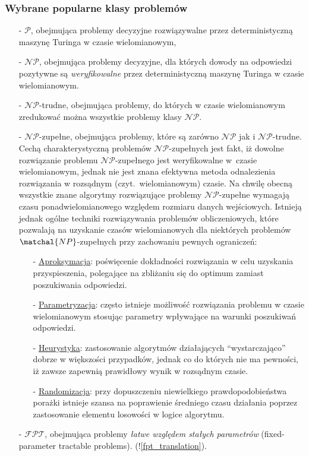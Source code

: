 \subsubsection{Wybrane popularne klasy problemów}
\label{sss_popular_cplx_classes}
\begin{itemize}
  \item[-] $\mathcal{P}$, obejmująca problemy decyzyjne rozwiązywalne przez
    deterministyczną maszynę Turinga w czasie wielomianowym,
  \item[-] $\mathcal{NP}$, obejmująca problemy decyzyjne, dla których dowody na 
    odpowiedzi pozytywne są \emph{weryfikowalne} przez deterministyczną maszynę
    Turinga w czasie wielomianowym.
  \item[-] $\mathcal{NP}$-trudne, obejmująca problemy, do których w czasie
    wielomianowym zredukować można wszystkie problemy klasy $\mathcal{NP}$.
  \item[-] $\mathcal{NP}$-zupełne, obejmująca problemy, które są zarówno
    $\mathcal{NP}$ jak i $\mathcal{NP}$-trudne.
    Cechą charakterystyczną problemów $\mathcal{NP}$-zupełnych jest fakt, iż
    dowolne rozwiązanie problemu $\mathcal{NP}$-zupełnego jest weryfikowalne
    w~czasie wielomianowym, jednak nie jest znana efektywna metoda odnalezienia
    rozwiązania w rozsądnym (czyt.\ wielomianowym) czasie. 
    Na chwilę obecną wszystkie znane algorytmy rozwiązujące problemy 
    $\mathcal{NP}$-zupełne wymagają czasu ponadwielomianowego względem rozmiaru
    danych wejściowych.
    Istnieją jednak ogólne techniki rozwiązywania problemów obliczeniowych,
    które pozwalają na uzyskanie czasów wielomianowych dla niektórych problemów
    $\matchal{NP}$-zupełnych przy zachowaniu pewnych ograniczeń:
    \begin{itemize}
      \item[-] \underline{Aproksymacja}: poświęcenie dokładności rozwiązania
        w celu uzyskania przyspieszenia, polegające na zbliżaniu się do
        optimum zamiast poszukiwania odpowiedzi.
      \item[-] \underline{Parametryzacja}: często istnieje możliwość rozwiązania
        problemu w czasie wielomianowym stosując parametry wpływające na warunki
        poszukiwań odpowiedzi.
      \item[-] \underline{Heurystyka}: zastosowanie algorytmów działających
        ``wystarczająco'' dobrze w większości przypadków, jednak co do których
        nie ma pewności, iż zawsze zapewnią prawidłowy wynik w rozsądnym czasie.
      \item[-] \underline{Randomizacja}: przy dopuszczeniu niewielkiego
        prawdopodobieństwa porażki istnieje szansa na poprawienie
        średniego czasu działania poprzez zastosowanie elementu losowości w
        logice algorytmu.
    \end{itemize}
  \item[-] $\mathcal{FPT}$, obejmująca problemy \emph{łatwe względem
    stałych parametrów} (fixed-parameter tractable problems). (!\ref{fpt_translation}).
\end{itemize}

